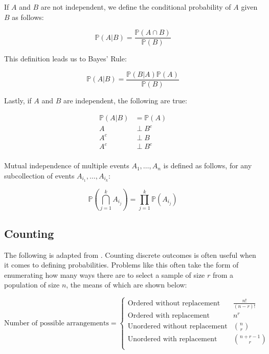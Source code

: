 \documentclass{report}
\begin{document}
If $A$ and $B$ are not independent, we define the conditional probability of $A$ given $B$ as follows:

\begin{equation}\label{eq:conditional-prob}
    \mathbb{P}(A|B) = \frac{\mathbb{P}(A \cap B)}{\mathbb{P}(B)}
\end{equation}

This definition leads us to Bayes' Rule:

\begin{equation}\label{eq:bayes-rule-for-sets}
    \mathbb{P}(A|B) = \frac{\mathbb{P}(B|A)\mathbb{P}(A)}{\mathbb{P}(B)} 
\end{equation}

Lastly, if $A$ and $B$ are independent, the following are true:

\begin{equation}\label{eq:independence-2}
    \begin{aligned}
        \mathbb{P}(A|B) &= \mathbb{P}(A) \\
        A &\perp B^c \\
        A^c &\perp B \\
        A^c &\perp B^c \\
    \end{aligned}
\end{equation}

Mutual independence of multiple events $A_1, \dots, A_n$ is defined as follows, for any subcollection of events $A_{i_1}, \dots, A_{i_k}$:

\begin{equation}\label{eq:mutual-independence}
    \mathbb{P}\left(\bigcap_{j=1}^k A_{i_j}\right) = \prod_{j=1}^k \mathbb{P}(A_{i_j})
\end{equation}

\subsection{Counting}

The following is adapted from \cite[Chapter~1.2.3]{casella_statistical_2002}. Counting discrete outcomes is often useful when it comes to defining probabilities. Problems like this often take the form of enumerating how many ways there are to select a sample of size $r$ from a population of size $n$, the means of which are shown below:

\begin{equation}\label{eq:counting}
    \text{Number of possible arrangements} = \begin{cases}
        \text{Ordered without replacement} & \frac{n!}{(n-r)!} \\
        \text{Ordered with replacement} & n^r \\
        \text{Unordered without replacement} & \binom{n}{r} \\
        \text{Unordered with replacement} & \binom{n+r-1}{r} \\
    \end{cases}
\end{equation}
\end{document}
